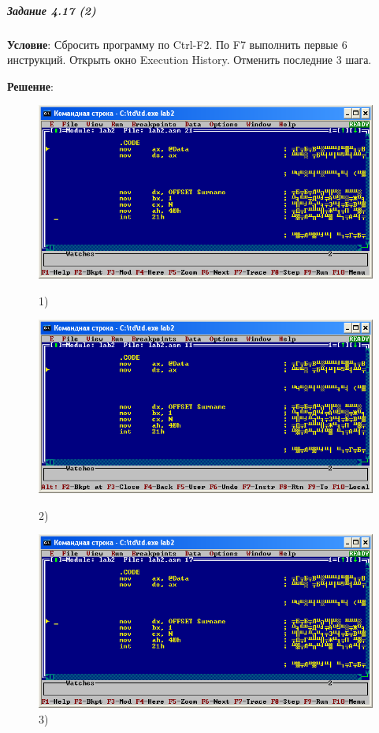 \subparagraph{Задание 4.17 (2)}

\textbf{Условие}:
Сбросить программу по Ctrl-F2. По F7 выполнить первые 6 инструкций. Открыть окно Execution History. Отменить последние 3 шага.

\textbf{Решение}:

\begin{figure}[!htp]
    \centering
    \begin{minipage}{0.32\textwidth}
        \centering
        \includegraphics[width=.99\linewidth]
            {../_INCLUDES/task-4-17-2/1.png}
        \caption{1) }
        \label{fig:task_4_17_2__1}
    \end{minipage}
    \begin {minipage}{0.32\textwidth}
        \centering
        \includegraphics[width=.99\linewidth]
            {../_INCLUDES/task-4-17-2/2.png}
        \caption{2) }
        \label{fig:task_4_17_2__2}
    \end{minipage}
    \begin {minipage}{0.32\textwidth}
        \centering
        \includegraphics[width=.99\linewidth]
            {../_INCLUDES/task-4-17-2/3.png}
        \caption{3) }
        \label{fig:task_4_17_2__3}
    \end{minipage}
\end{figure}

